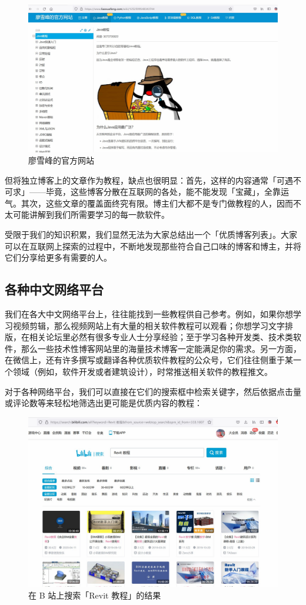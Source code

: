 \begin{figure}[htb!]
  \centering
  \includegraphics[width=12cm]{assets/Liao_Xuefeng.jpg}
  \caption{廖雪峰的官方网站}
  \label{Liao_Xuefeng}
\end{figure}

但将独立博客上的文章作为教程，缺点也很明显：首先，这样的内容通常「可遇不可求」——毕竟，这些博客分散在互联网的各处，能不能发现「宝藏」，全靠运气。其次，这些文章的覆盖面终究有限。博主们大都不是专门做教程的人，因而不太可能讲解到我们所需要学习的每一款软件。

受限于我们的知识积累，我们显然无法为大家总结出一个「优质博客列表」。大家可以在互联网上探索的过程中，不断地发现那些符合自己口味的博客和博主，并将它们分享给更多有需要的人。

\subsection{各种中文网络平台}

我们在各大中文网络平台上，往往能找到一些教程供自己参考。例如，如果你想学习视频剪辑，那么视频网站上有大量的相关软件教程可以观看；你想学习文字排版，在相关论坛里必然有很多专业人士分享经验；至于学习各种开发类、技术类软件，那么一些技术性博客网站里的海量技术博客一定能满足你的需求。另一方面，在微信上，还有许多撰写或翻译各种优质软件教程的公众号，它们往往侧重于某一个领域（例如，软件开发或者建筑设计），时常推送相关软件的教程推文。

对于各种网络平台，我们可以直接在它们的搜索框中检索关键字，然后依据点击量或评论数等来轻松地筛选出更可能是优质内容的教程：

\begin{figure}[htb!]
  \centering
  \includegraphics[width=12cm]{assets/Bilibili.jpg}
  \caption{在 B 站上搜索「Revit 教程」的结果}
  \label{Bilibili}
\end{figure}

